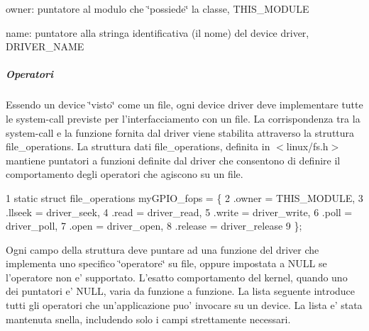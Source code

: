 \begin{DoxyItemize}
\item owner\+: puntatore al modulo che \char`\"{}possiede\char`\"{} la classe, T\+H\+I\+S\+\_\+\+M\+O\+D\+U\+L\+E
\item name\+: puntatore alla stringa identificativa (il nome) del device driver, D\+R\+I\+V\+E\+R\+\_\+\+N\+A\+M\+E
\end{DoxyItemize}

\subparagraph*{Operatori}

Essendo un device \char`\"{}visto\char`\"{} come un file, ogni device driver deve implementare tutte le system-\/call previste per l'interfacciamento con un file. La corrispondenza tra la system-\/call e la funzione fornita dal driver viene stabilita attraverso la struttura file\+\_\+operations. La struttura dati file\+\_\+operations, definita in $<$linux/fs.\+h$>$ mantiene puntatori a funzioni definite dal driver che consentono di definire il comportamento degli operatori che agiscono su un file.


\begin{DoxyCode}
1 static struct file\_operations myGPIO\_fops = \{
2     .owner      = THIS\_MODULE,
3     .llseek     = driver\_seek,
4     .read       = driver\_read,
5     .write      = driver\_write,
6     .poll       = driver\_poll,
7     .open       = driver\_open,
8     .release    = driver\_release
9 \};
\end{DoxyCode}


Ogni campo della struttura deve puntare ad una funzione del driver che implementa uno specifico \char`\"{}operatore\char`\"{} su file, oppure impostata a N\+U\+L\+L se l'operatore non e' supportato. L'esatto comportamento del kernel, quando uno dei puntatori e' N\+U\+L\+L, varia da funzione a funzione. La lista seguente introduce tutti gli operatori che un'applicazione puo' invocare su un device. La lista e' stata mantenuta snella, includendo solo i campi strettamente necessari.


